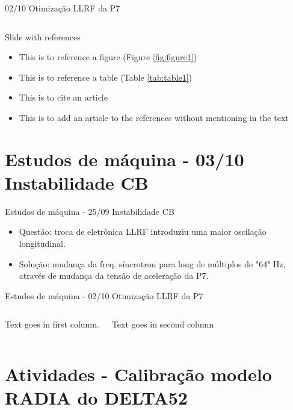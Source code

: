\documentclass{beamer}					%
\begin{document}
\begin{frame}{02/10 Otimização LLRF da P7}
\begin{columns}
\end{columns}
\end{frame}

\begin{frame}{Slide with references}
\begin{itemize}
    \item<1->This is to reference a figure (Figure \ref{fig:figure1})\\
    \item<2->This is to reference a table (Table \ref{tab:table1})\\
    \item<3->This is to cite an article \cite{Ahmed2018a}\\
    \item<4->This is to add an article to the references without mentioning in the text \nocite{Ahmed2018a}\\
\end{itemize}
\end{frame}

\section{Estudos de máquina - 03/10 Instabilidade CB}

\begin{frame}{Estudos de máquina - 25/09 Instabilidade CB}
    \begin{itemize}
		\item<1-> Questão: troca de eletrônica LLRF introduziu uma maior oscilação longitudinal.
        \item<2-> Solução: mudança da freq. síncrotron para long de múltiplos de "64" Hz, através de mudança da tensão de aceleração da P7.
	\end{itemize}
\end{frame}

\begin{frame}{Estudos de máquina - 02/10 Otimização LLRF da P7}
	\begin{columns}
        Text goes in first column.
        
        Text goes in second column
	\end{columns}
\end{frame}

\section{Atividades - Calibração modelo RADIA do DELTA52}
\end{document}
